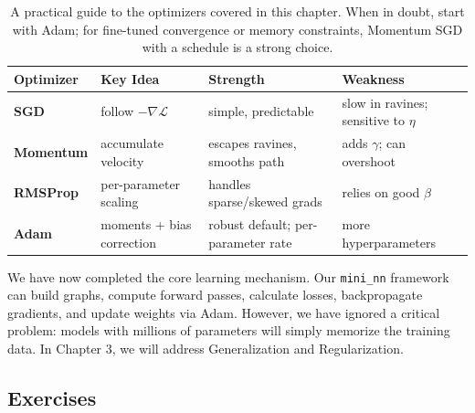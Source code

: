 \documentclass{tufte-handout}
\begin{document}
\begin{table}[htbp]
\centering
\small
\begin{tabularx}{\textwidth}{@{}>{\raggedright\arraybackslash}p{2.2cm}X X X@{}}
\toprule
\textbf{Optimizer} & \textbf{Key Idea} & \textbf{Strength} & \textbf{Weakness} \\
\midrule
\textbf{SGD} & follow $-\nabla \mathcal{L}$ & simple, predictable & slow in ravines; sensitive to $\eta$ \\
\textbf{Momentum} & accumulate velocity & escapes ravines, smooths path & adds $\gamma$; can overshoot \\
\textbf{RMSProp} & per-parameter scaling & handles sparse/skewed grads & relies on good $\beta$ \\
\textbf{Adam} & moments + bias correction & robust default; per-parameter rate & more hyperparameters \\
\bottomrule
\end{tabularx}
\caption{A practical guide to the optimizers covered in this chapter. When in doubt, start with Adam; for fine-tuned convergence or memory constraints, Momentum SGD with a schedule is a strong choice.}
\label{tab:optimizer_guide}
\end{table}

\begin{remark}
We have now completed the core learning mechanism. Our \texttt{mini\_nn} framework can build graphs, compute forward passes, calculate losses, backpropagate gradients, and update weights via Adam. However, we have ignored a critical problem: models with millions of parameters will simply memorize the training data. In Chapter 3, we will address Generalization and Regularization.
\end{remark}

\subsection{Exercises}
\end{document}
